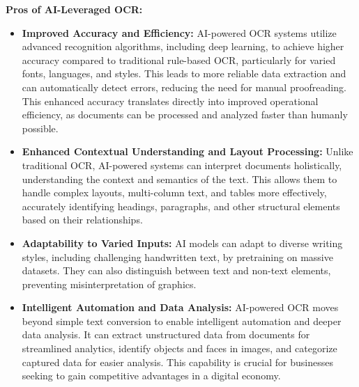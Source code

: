 \textbf{Pros of AI-Leveraged OCR:}
\begin{itemize}
    \item \textbf{Improved Accuracy and Efficiency:} AI-powered OCR systems utilize advanced recognition algorithms, including deep learning, to achieve higher accuracy compared to traditional rule-based OCR, particularly for varied fonts, languages, and styles. This leads to more reliable data extraction and can automatically detect errors, reducing the need for manual proofreading. This enhanced accuracy translates directly into improved operational efficiency, as documents can be processed and analyzed faster than humanly possible.
    \item \textbf{Enhanced Contextual Understanding and Layout Processing:} Unlike traditional OCR, AI-powered systems can interpret documents holistically, understanding the context and semantics of the text. This allows them to handle complex layouts, multi-column text, and tables more effectively, accurately identifying headings, paragraphs, and other structural elements based on their relationships.
    \item \textbf{Adaptability to Varied Inputs:} AI models can adapt to diverse writing styles, including challenging handwritten text, by pretraining on massive datasets. They can also distinguish between text and non-text elements, preventing misinterpretation of graphics.
    \item \textbf{Intelligent Automation and Data Analysis:} AI-powered OCR moves beyond simple text conversion to enable intelligent automation and deeper data analysis. It can extract unstructured data from documents for streamlined analytics, identify objects and faces in images, and categorize captured data for easier analysis. This capability is crucial for businesses seeking to gain competitive advantages in a digital economy.
\end{itemize}


